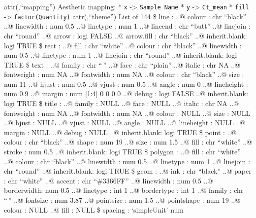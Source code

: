 \documentclass[
]{article}
\begin{document}
attr(,``mapping'') Aesthetic mapping: * \texttt{x} -\textgreater{}
\texttt{Sample\ Name} * \texttt{y} -\textgreater{} \texttt{Ct\_mean} *
\texttt{fill} -\textgreater{} \texttt{factor(Quantity)} attr(,``theme'')
List of 144 \$ line : ..@ colour : chr ``black'' ..@ linewidth : num 0.5
..@ linetype : num 1 ..@ lineend : chr ``butt'' ..@ linejoin : chr
``round'' ..@ arrow : logi FALSE ..@ arrow.fill : chr ``black'' ..@
inherit.blank: logi TRUE \$ rect : ..@ fill : chr ``white'' ..@ colour :
chr ``black'' ..@ linewidth : num 0.5 ..@ linetype : num 1 ..@ linejoin
: chr ``round'' ..@ inherit.blank: logi TRUE \$ text : ..@ family : chr
``\,'' ..@ face : chr ``plain'' ..@ italic : chr NA ..@ fontweight : num
NA ..@ fontwidth : num NA ..@ colour : chr ``black'' ..@ size : num 11
..@ hjust : num 0.5 ..@ vjust : num 0.5 ..@ angle : num 0 ..@ lineheight
: num 0.9 ..@ margin : num {[}1:4{]} 0 0 0 0 ..@ debug : logi FALSE ..@
inherit.blank: logi TRUE \$ title : ..@ family : NULL ..@ face : NULL
..@ italic : chr NA ..@ fontweight : num NA ..@ fontwidth : num NA ..@
colour : NULL ..@ size : NULL ..@ hjust : NULL ..@ vjust : NULL ..@
angle : NULL ..@ lineheight : NULL ..@ margin : NULL ..@ debug : NULL
..@ inherit.blank: logi TRUE \$ point : ..@ colour : chr ``black'' ..@
shape : num 19 ..@ size : num 1.5 ..@ fill : chr ``white'' ..@ stroke :
num 0.5 ..@ inherit.blank: logi TRUE \$ polygon : ..@ fill : chr
``white'' ..@ colour : chr ``black'' ..@ linewidth : num 0.5 ..@
linetype : num 1 ..@ linejoin : chr ``round'' ..@ inherit.blank: logi
TRUE \$ geom : ..@ ink : chr ``black'' ..@ paper : chr ``white'' ..@
accent : chr ``\#3366FF'' ..@ linewidth : num 0.5 ..@ borderwidth: num
0.5 ..@ linetype : int 1 ..@ bordertype : int 1 ..@ family : chr ``\,''
..@ fontsize : num 3.87 ..@ pointsize : num 1.5 ..@ pointshape : num 19
..@ colour : NULL ..@ fill : NULL \$ spacing : `simpleUnit' num
\end{document}
